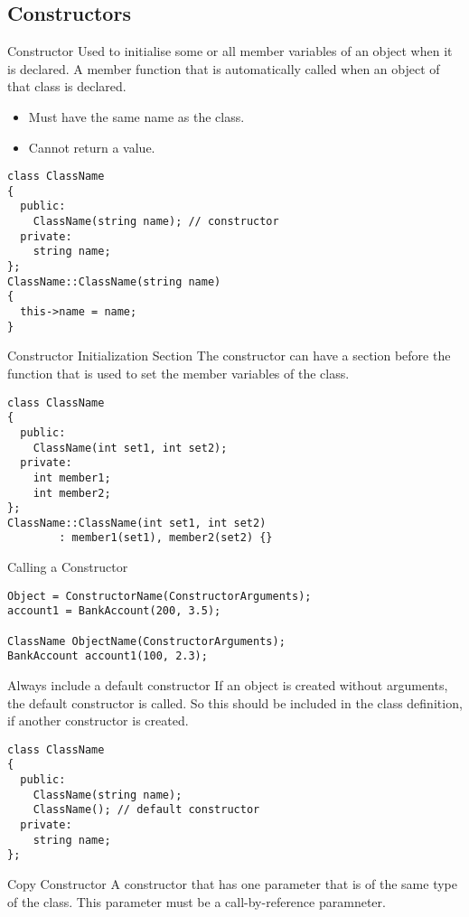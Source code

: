 \documentclass[\main/notes.tex]{subfiles}
\begin{document}
			\subsection{Constructors}
				\begin{definition}{Constructor}
					Used to initialise some or all member variables of an object when it is declared. A member function that is automatically called when an object of that class is declared.
					\begin{itemize}[nosep]
						\item Must have the same name as the class.
						\item Cannot return a value.
					\end{itemize}
					\begin{verbatim}
class ClassName
{
  public:
    ClassName(string name); // constructor
  private:
    string name;
};
ClassName::ClassName(string name)
{
  this->name = name;
}
					\end{verbatim}
				\end{definition}
				\begin{sidenote}{Constructor Initialization Section}
					The constructor can have a section before the function that is used to set the member variables of the class.
					\begin{verbatim}
class ClassName
{
  public:
    ClassName(int set1, int set2);
  private:
    int member1;
    int member2;
};
ClassName::ClassName(int set1, int set2)
        : member1(set1), member2(set2) {}
					\end{verbatim}
				\end{sidenote}
				\begin{codebox}{Calling a Constructor}
					\begin{verbatim}
Object = ConstructorName(ConstructorArguments);
account1 = BankAccount(200, 3.5);

ClassName ObjectName(ConstructorArguments);
BankAccount account1(100, 2.3);
					\end{verbatim}
				\end{codebox}
				\begin{sidenote}{Always include a default constructor}
					If an object is created without arguments, the default constructor is called. So this should be included in the class definition, if another constructor is created.
					\begin{verbatim}
class ClassName
{
  public:
    ClassName(string name);
    ClassName(); // default constructor
  private:
    string name;
};
					\end{verbatim}
				\end{sidenote}
				\begin{definition}{Copy Constructor}
					A constructor that has one parameter that is of the same type of the class. This parameter must be a call-by-reference paramneter.
				\end{definition}
\end{document}
